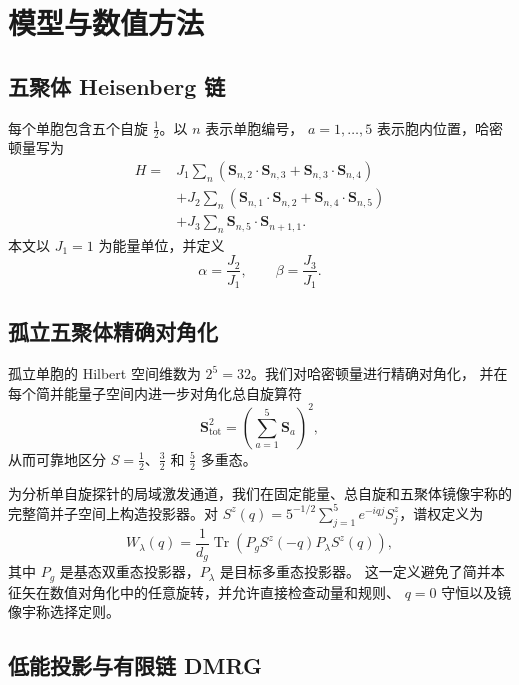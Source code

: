 \section{模型与数值方法}

\subsection{五聚体 Heisenberg 链}

每个单胞包含五个自旋 $\frac{1}{2}$。以 $n$ 表示单胞编号，
$a=1,\ldots,5$ 表示胞内位置，哈密顿量写为
\begin{align}
H={}&J_1\sum_n
\left(
\bm S_{n,2}\cdot\bm S_{n,3}
+\bm S_{n,3}\cdot\bm S_{n,4}
\right)
\nonumber\\
&+J_2\sum_n
\left(
\bm S_{n,1}\cdot\bm S_{n,2}
+\bm S_{n,4}\cdot\bm S_{n,5}
\right)
\nonumber\\
&+J_3\sum_n
\bm S_{n,5}\cdot\bm S_{n+1,1}.
\label{eq:hamiltonian}
\end{align}
本文以 $J_1=1$ 为能量单位，并定义
\begin{equation}
\alpha=\frac{J_2}{J_1},
\qquad
\beta=\frac{J_3}{J_1}.
\label{eq:ratios}
\end{equation}

\subsection{孤立五聚体精确对角化}

孤立单胞的 Hilbert 空间维数为 $2^5=32$。我们对哈密顿量进行精确对角化，
并在每个简并能量子空间内进一步对角化总自旋算符
\begin{equation}
\bm S_{\mathrm{tot}}^2=
\left(\sum_{a=1}^{5}\bm S_a\right)^2,
\end{equation}
从而可靠地区分 $S=\frac{1}{2}$、$\frac{3}{2}$ 和 $\frac{5}{2}$
多重态。

为分析单自旋探针的局域激发通道，我们在固定能量、总自旋和五聚体镜像宇称的
完整简并子空间上构造投影器。对
$S^z(q)=5^{-1/2}\sum_{j=1}^{5}e^{-iqj}S_j^z$，谱权定义为
\begin{equation}
W_\lambda(q)=\frac{1}{d_g}
\operatorname{Tr}\left(P_g S^z(-q)P_\lambda S^z(q)\right),
\label{eq:local-projector-weight}
\end{equation}
其中 $P_g$ 是基态双重态投影器，$P_\lambda$ 是目标多重态投影器。
这一定义避免了简并本征矢在数值对角化中的任意旋转，并允许直接检查动量和规则、
$q=0$ 守恒以及镜像宇称选择定则。

\subsection{低能投影与有限链 DMRG}

